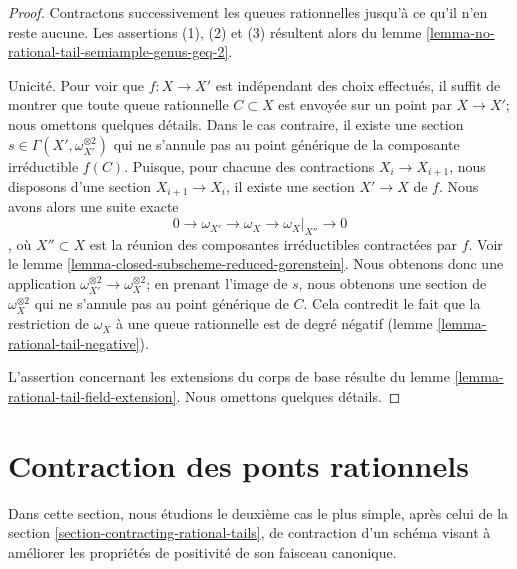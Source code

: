 \begin{proof}
Contractons successivement les queues rationnelles jusqu'à ce qu'il n'en reste aucune. Les assertions (1), (2) et (3) résultent alors du lemme \ref{lemma-no-rational-tail-semiample-genus-geq-2}.

\medskip\noindent
Unicité. Pour voir que $f : X \to X'$ est indépendant des choix effectués, il suffit de montrer que toute queue rationnelle $C \subset X$ est envoyée sur un point par $X \to X'$; nous omettons quelques détails. Dans le cas contraire, il existe une section $s \in \Gamma(X', \omega_{X'}^{\otimes 2})$ qui ne s'annule pas au point générique de la composante irréductible $f(C)$. Puisque, pour chacune des contractions $X_i \to X_{i + 1}$, nous disposons d'une section $X_{i + 1} \to X_i$, il existe une section $X' \to X$ de $f$. Nous avons alors une suite exacte $$
0 \to \omega_{X'} \to \omega_X \to \omega_X|_{X''} \to 0
$$, où $X'' \subset X$ est la réunion des composantes irréductibles contractées par $f$. Voir le lemme \ref{lemma-closed-subscheme-reduced-gorenstein}. Nous obtenons donc une application $\omega_{X'}^{\otimes 2} \to \omega_X^{\otimes 2}$; en prenant l'image de $s$, nous obtenons une section de $\omega_X^{\otimes 2}$ qui ne s'annule pas au point générique de $C$. Cela contredit le fait que la restriction de $\omega_X$ à une queue rationnelle est de degré négatif (lemme \ref{lemma-rational-tail-negative}).

\medskip\noindent
L'assertion concernant les extensions du corps de base résulte du lemme \ref{lemma-rational-tail-field-extension}. Nous omettons quelques détails.
\end{proof}





\section{Contraction des ponts rationnels}
\label{section-contracting-rational-bridges}

\noindent
Dans cette section, nous étudions le deuxième cas le plus simple, après celui de la section \ref{section-contracting-rational-tails}, de contraction d'un schéma visant à améliorer les propriétés de positivité de son faisceau canonique.

